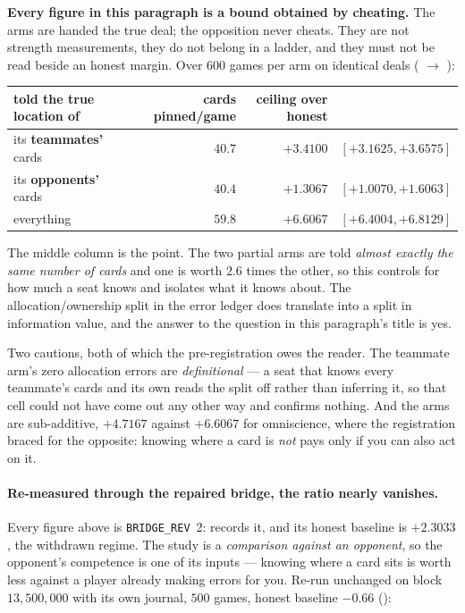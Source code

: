 \documentclass[11pt,letterpaper]{article}
\begin{document}
\textbf{Every figure in this paragraph is a bound obtained by cheating.} The
arms are  handed the true deal; the opposition never
cheats. They are not strength measurements, they do not belong in a ladder, and
they must not be read beside an honest margin. Over $600$ games per arm on
identical deals ( $\rightarrow$
):

\begin{center}
\small
\begin{tabular}{lrrr}
\toprule
told the true location of & cards pinned/game & ceiling over honest & \\
\midrule
its \textbf{teammates'} cards & $40.7$ & $+3.4100$ & $[+3.1625, +3.6575]$ \\
its \textbf{opponents'} cards & $40.4$ & $+1.3067$ & $[+1.0070, +1.6063]$ \\
everything & $59.8$ & $+6.6067$ & $[+6.4004, +6.8129]$ \\
\bottomrule
\end{tabular}
\end{center}

The middle column is the point. The two partial arms are told \emph{almost exactly
the same number of cards} and one is worth $2.6$ times the other, so this
controls for how much a seat knows and isolates what it knows about. The
allocation/ownership split in the error ledger does translate into a split in
information value, and the answer to the question in this paragraph's title is
yes.

Two cautions, both of which the pre-registration owes the reader. The teammate
arm's zero allocation errors are \emph{definitional} --- a seat that knows every
teammate's cards and its own reads the split off rather than inferring it, so
that cell could not have come out any other way and confirms nothing. And the
arms are sub-additive, $+4.7167$ against $+6.6067$ for omniscience, where the
registration braced for the opposite: knowing where a card is \emph{not} pays
only if you can also act on it.

\paragraph{Re-measured through the repaired bridge, the ratio nearly vanishes.}
\label{sec:res-ceiling-rev3}
Every figure above is \texttt{BRIDGE\_REV}~2: 
records it, and its honest baseline is $+2.3033$, the withdrawn regime. The
study is a \emph{comparison against an opponent}, so the opponent's competence
is one of its inputs --- knowing where a card sits is worth less against a
player already making errors for you. Re-run unchanged on block
$13{,}500{,}000$ with its own journal, $500$ games, honest baseline $-0.66$
():
\end{document}
